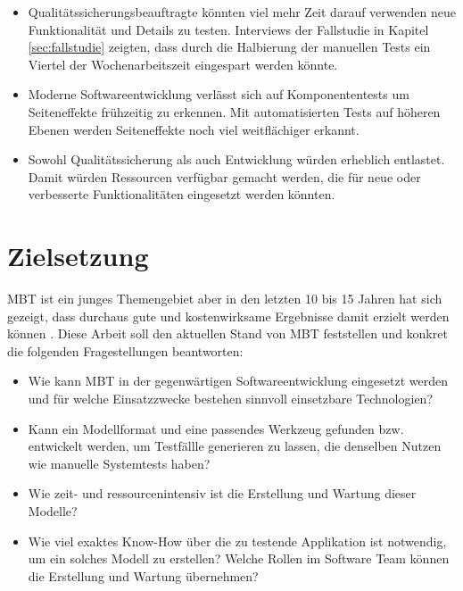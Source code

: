 \begin{itemize}
	\item Qualitätssicherungsbeauftragte könnten viel mehr Zeit darauf verwenden neue Funktionalität und Details zu testen. Interviews der Fallstudie in Kapitel \ref{sec:fallstudie} zeigten, dass durch die Halbierung der manuellen Tests ein Viertel der Wochenarbeitszeit eingespart werden könnte. 
	\item Moderne Softwareentwicklung verlässt sich auf Komponententests um Seiteneffekte  frühzeitig zu erkennen. Mit automatisierten Tests auf höheren Ebenen werden Seiteneffekte noch viel weitflächiger erkannt. 
	\item Sowohl Qualitätssicherung als auch Entwicklung würden erheblich entlastet. Damit würden Ressourcen verfügbar gemacht werden, die für neue oder verbesserte Funktionalitäten eingesetzt werden könnten.
\end{itemize}

\section{Zielsetzung}

\Gls{MBT} ist ein junges Themengebiet aber in den letzten 10 bis 15 Jahren hat sich gezeigt, dass durchaus gute und kostenwirksame Ergebnisse damit erzielt werden können \cite{utting_practical_2007}. Diese Arbeit soll den aktuellen Stand von \Gls{MBT} feststellen und konkret die folgenden Fragestellungen beantworten:

\begin{itemize}
	\item Wie kann \Gls{MBT} in der gegenwärtigen Softwareentwicklung eingesetzt werden und für welche Einsatzzwecke bestehen sinnvoll  einsetzbare Technologien?
	\item Kann ein Modellformat und eine passendes Werkzeug gefunden bzw. entwickelt werden, um Testfällle generieren zu lassen, die denselben Nutzen wie manuelle Systemtests haben?
	\item Wie zeit- und ressourcenintensiv ist die Erstellung und Wartung dieser Modelle?
	\item Wie viel exaktes Know-How über die zu testende Applikation ist notwendig, um ein solches Modell zu erstellen? Welche Rollen im Software Team können die Erstellung und Wartung übernehmen?
\end{itemize}

